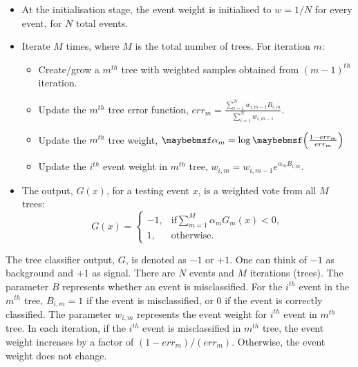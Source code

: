 \begin{itemize}
  \item At the initialisation stage, the event weight is initialised to $w = 1 / N$ for every event, for $N$ total events.
  \item Iterate $M$ times, where $M$ is the total number of trees. For iteration $m$:
    \begin{itemize}
      \item Create/grow a $m^{th}$ tree  with weighted samples obtained from $(m-1)^{th}$ iteration.
      \item Update the $m^{th}$ tree error function, $err_m = \frac{\sum_{i = 1}^{N} w_{i,m-1} B_{i,m} }{\sum_{i = 1}^{N}w_{i,m-1}}$.
      \item Update the $m^{th}$ tree weight,  $\alpha_m = \log\parenths{\frac{1 - err_m}{err_m}}$
      \item Update the $i^{th}$ event weight in $m^{th}$ tree, $w_{i,m} = w_{i,m-1} e^{\alpha_m B_{i,m} }$.
    \end{itemize}
  \item The output, $G(x)$, for a testing event $x$, is a weighted vote from all $M$ trees:
  \begin{equation}
    G(x)=
     \begin{cases}
      -1, & \mbox{if} \sum_{m=1}^{M}\alpha_mG_m(x) < 0 , \\
      1, & \mbox{otherwise}.
    \end{cases}
  \end{equation}
\end{itemize}
The tree classifier output, $G$, is denoted as  $-1$ or $+1$. One can think of $-1$ as background and $+1$ as signal. There are $N$ events and $M$ iterations (trees). The parameter $B$ represents whether an event is misclassified. For the $i^{th}$ event in the  $m^{th}$ tree,  $B_{i,m} = 1$ if the event is misclassified, or 0 if the event is correctly classified. The parameter $w_{i,m}$ represents the event weight for $i^{th}$ event  in $m^{th}$ tree. In each iteration, if the $i^{th}$ event is misclassified in $m^{th}$ tree, the event weight increases by a factor of $(1 - err_m)/(err_m)$. Otherwise, the event weight does not change.


